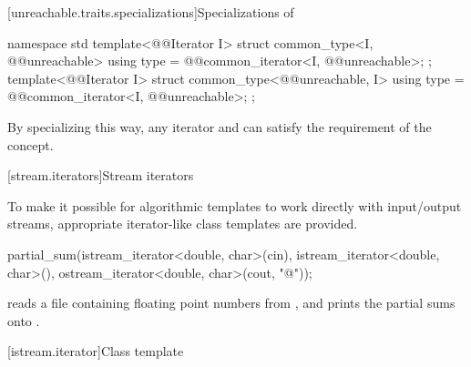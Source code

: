 \begin{addedblock}
[unreachable.traits.specializations]{Specializations of }

%
\begin{itemdecl}
namespace std {
  template<@@Iterator I>
  struct common_type<I, @@unreachable> {
    using type = @@common_iterator<I, @@unreachable>;
  };
  template<@@Iterator I>
  struct common_type<@@unreachable, I> {
    using type = @@common_iterator<I, @@unreachable>;
  };
}
\end{itemdecl}

\begin{itemdescr}
\pnum
\enternote By specializing  this way, any iterator and
 can satisfy the  requirement of the
 concept.\exitnote
\end{itemdescr}

\end{addedblock}

[stream.iterators]{Stream iterators}

\pnum
To make it possible for algorithmic templates to work directly with input/output streams, appropriate
iterator-like
class templates
are provided.

\enterexample
\begin{codeblock}
partial_sum(istream_iterator<double, char>(cin),
  istream_iterator<double, char>(),
  ostream_iterator<double, char>(cout, "@\textbackslash@n"));
\end{codeblock}

reads a file containing floating point numbers from
,
and prints the partial sums onto
.
\exitexample

[istream.iterator]{Class template }

